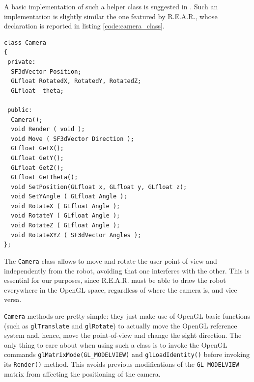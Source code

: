 %
A basic implementation of such a helper class is suggested 
in \cite{opengl:camera}. Such an implementation is slightly 
similar the one featured by \textsf{R.E.A.R.}, whose 
declaration is reported in listing \ref{code:camera_class}.
%
\begin{lstlisting}[caption={\texttt{Camera} class declaration}, label={code:camera_class}, frame=trBL]
class Camera
{
 private:
  SF3dVector Position;
  GLfloat RotatedX, RotatedY, RotatedZ;	
  GLfloat _theta;

 public:
  Camera();
  void Render ( void );
  void Move ( SF3dVector Direction );
  GLfloat GetX();
  GLfloat GetY();
  GLfloat GetZ();
  GLfloat GetTheta();
  void SetPosition(GLfloat x, GLfloat y, GLfloat z);
  void SetYAngle ( GLfloat Angle );
  void RotateX ( GLfloat Angle );
  void RotateY ( GLfloat Angle );
  void RotateZ ( GLfloat Angle );
  void RotateXYZ ( SF3dVector Angles );
};
\end{lstlisting}
%
The \texttt{Camera} class allows to move and rotate the user 
point of view and independently from the robot, avoiding 
that one interferes with the other. 
%
This is essential for our purposes, since \textsf{R.E.A.R.}
must be able to draw the robot everywhere in the OpenGL space, 
regardless of where the camera is, and vice versa.
%

%
\texttt{Camera} methods are pretty simple: they just make 
use of OpenGL basic functions (such as \texttt{glTranslate} 
and \texttt{glRotate}) to actually move the OpenGL reference 
system and, hence, move the point-of-view and change the sight 
direction.
%
The only thing to care about when using such a class is 
to invoke the OpenGL commands \texttt{glMatrixMode(GL\_MODELVIEW)} 
and \texttt{glLoadIdentity()} before invoking its 
\texttt{Render()} method. This avoids previous modifications 
of the \texttt{GL\_MODELVIEW} matrix from affecting the 
positioning of the camera.
%

%
